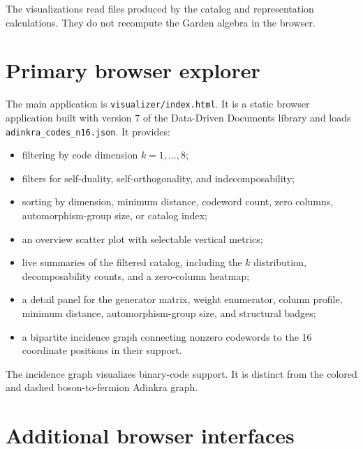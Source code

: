 \documentclass[11pt]{article}
\newcommand{\pathcode}[1]{\nolinkurl{#1}}
\begin{document}
The visualizations read files produced by the catalog and representation
calculations.  They do not recompute the Garden algebra in the browser.

\section{Primary browser explorer}

The main application is \pathcode{visualizer/index.html}.  It is a static
browser application built with version 7 of the Data-Driven Documents library
\cite{bostock2011} and loads \pathcode{adinkra_codes_n16.json}.  It provides:

\begin{itemize}
  \item filtering by code dimension $k=1,\ldots,8$;
  \item filters for self-duality, self-orthogonality, and indecomposability;
  \item sorting by dimension, minimum distance, codeword count, zero columns,
        automorphism-group size, or catalog index;
  \item an overview scatter plot with selectable vertical metrics;
  \item live summaries of the filtered catalog, including the $k$ distribution,
        decomposability counts, and a zero-column heatmap;
  \item a detail panel for the generator matrix, weight enumerator, column
        profile, minimum distance, automorphism-group size, and structural badges;
  \item a bipartite incidence graph connecting nonzero codewords to the 16
        coordinate positions in their support.
\end{itemize}

The incidence graph visualizes binary-code support.  It is distinct from the
colored and dashed boson-to-fermion Adinkra graph.

\section{Additional browser interfaces}
\end{document}
